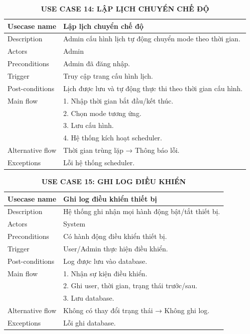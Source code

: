 \begin{table}[H]
\centering
\caption*{\textbf{USE CASE 14: LẬP LỊCH CHUYỂN CHẾ ĐỘ}}
\renewcommand{\arraystretch}{1.3}
\begin{tabular}{|p{4cm}|p{11cm}|}
\hline
Usecase name & Lập lịch chuyển chế độ \\
\hline
Description & Admin cấu hình lịch tự động chuyển mode theo thời gian. \\
\hline
Actors & Admin \\
\hline
Preconditions & Admin đã đăng nhập. \\
\hline
Trigger & Truy cập trang cấu hình lịch. \\
\hline
Post-conditions & Lịch được lưu và tự động thực thi theo thời gian cấu hình. \\
\hline
Main flow &
1. Nhập thời gian bắt đầu/kết thúc.\\ &
2. Chọn mode tương ứng.\\ &
3. Lưu cấu hình.\\ &
4. Hệ thống kích hoạt scheduler. \\
\hline
Alternative flow & Thời gian trùng lặp → Thông báo lỗi. \\
\hline
Exceptions & Lỗi hệ thống scheduler. \\
\hline
\end{tabular}
\end{table}
\begin{table}[H]
\centering
\caption*{\textbf{USE CASE 15: GHI LOG ĐIỀU KHIỂN}}
\renewcommand{\arraystretch}{1.3}
\begin{tabular}{|p{4cm}|p{11cm}|}
\hline
Usecase name & Ghi log điều khiển thiết bị \\
\hline
Description & Hệ thống ghi nhận mọi hành động bật/tắt thiết bị. \\
\hline
Actors & System \\
\hline
Preconditions & Có hành động điều khiển thiết bị. \\
\hline
Trigger & User/Admin thực hiện điều khiển. \\
\hline
Post-conditions & Log được lưu vào database. \\
\hline
Main flow &
1. Nhận sự kiện điều khiển.\\ &
2. Ghi user, thời gian, trạng thái trước/sau.\\ &
3. Lưu database. \\
\hline
Alternative flow & Không có thay đổi trạng thái → Không ghi log. \\
\hline
Exceptions & Lỗi ghi database. \\
\hline
\end{tabular}
\end{table}
